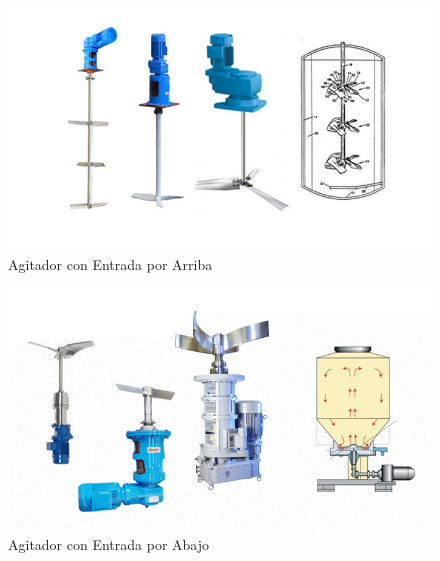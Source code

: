             \begin{multicols}{2}
                \begin{figure}
                    \centering
                    \includegraphics[width=\textwidth]{img/fotos/batch_agitado_entrada_por_arriba.jpg}
                    \caption[Agitador con Entrada por Arriba]{Agitador con Entrada por Arriba \cite{cd_agitatorcom_cd_2012}}
                    \label{fig:batch_agitado_entrada_por_arriba}
                \end{figure}
                \begin{figure}
                    \centering
                    \includegraphics[width=\textwidth]{img/fotos/batch_agitado_entrada_por_abajo.png}
                    \caption[Agitador con Entrada por Abajo]{Agitador con Entrada por Abajo \cite{cd_agitatorcom_cd_2012}}
                    \label{fig:batch_agitado_entrada_por_abajo}
                \end{figure}
            \end{multicols}
            
